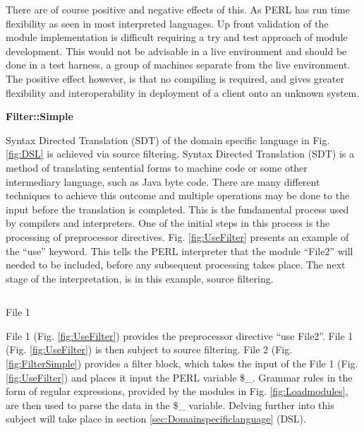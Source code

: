 		\vspace{4mm}
		There are of course positive and negative effects of this.  As PERL has run time flexibility as seen in most interpreted languages.  
		Up front validation of the module implementation is difficult requiring a try and test approach of module development.  
		This would not be advisable in a live environment and should be done in a test harness,  a group of machines separate from the live environment.
		\newline
		The positive effect however, is that no compiling is required, and gives greater flexibility and interoperability in deployment of a 
		client onto an unknown system.
		\newline
		
		\large{\bfseries{Filter::Simple}}	
		
		\normalsize
		{					
			Syntax Directed Translation (SDT) of the domain specific language in Fig. \ref{fig:DSL} is achieved via source filtering.
			Syntax Directed Translation (SDT) is a method of translating sentential forms to machine code or some other 
			intermediary language, such as Java byte code.  There are many different techniques to achieve this outcome and 
			multiple operations may be done to the input before the translation is completed.  This is the fundamental process used by compilers 
			and interpreters.
			\newline
			\newline
			One of the initial steps in this process is the processing of preprocessor directives.
			Fig. \ref{fig:UseFilter} presents an example of the ``use'' keyword.  This tells the PERL interpreter that the module ``File2''
			will needed to be included, before any subsequent processing takes place.  The next stage of the interpretation, is in this example, 
			source filtering.	
			\newline
		}
		
		\begin{figurehere}
			\inputminted[linenos=true,fontsize=\footnotesize,tabsize=2]{perl}{pages/chapter3/smippets/usefilter.pl}
			\vspace{-5mm}
			\caption{File 1}
			\label{fig:UseFilter}
		\end{figurehere}
		
		\vspace{5mm}
		\normalsize
		{
			File 1 (Fig. \ref{fig:UseFilter}) provides the preprocessor directive ``use File2''.  File 1 (Fig. \ref{fig:UseFilter}) is then subject to source filtering.
			File 2 (Fig. \ref{fig:FilterSimple}) provides a filter block, which takes the input of the File 1 (Fig. \ref{fig:UseFilter}) and places it input the PERL
			variable \$\_.
			Grammar rules in the form of regular expressions, provided by the modules in Fig. \ref{fig:Loadmodules}, are then used to parse the data in the \$\_ variable.
			\newline
			\newline
			Delving further into this subject will take place in section \ref{sec:Domainspecificlanguage} (DSL).
			\newline
		}
		
